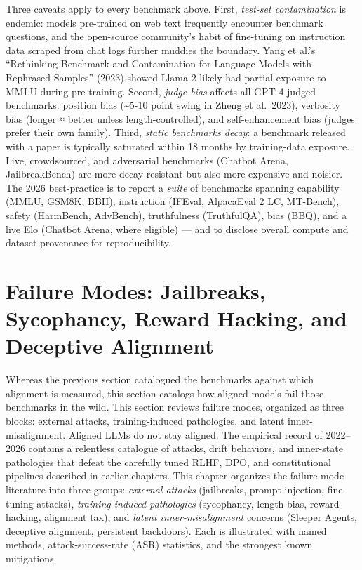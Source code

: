 Three caveats apply to every benchmark above. First, \emph{test-set contamination} is endemic: models pre-trained on web text frequently encounter benchmark questions, and the open-source community's habit of fine-tuning on instruction data scraped from chat logs further muddies the boundary. Yang et al.'s ``Rethinking Benchmark and Contamination for Language Models with Rephrased Samples'' (2023) showed Llama-2 likely had partial exposure to MMLU during pre-training. Second, \emph{judge bias} affects all GPT-4-judged benchmarks: position bias (\textasciitilde5-10 point swing in Zheng et al.~2023), verbosity bias (longer ≈ better unless length-controlled), and self-enhancement bias (judges prefer their own family). Third, \emph{static benchmarks decay}: a benchmark released with a paper is typically saturated within 18 months by training-data exposure. Live, crowdsourced, and adversarial benchmarks (Chatbot Arena, JailbreakBench) are more decay-resistant but also more expensive and noisier. The 2026 best-practice is to report a \emph{suite} of benchmarks spanning capability (MMLU, GSM8K, BBH), instruction (IFEval, AlpacaEval 2 LC, MT-Bench), safety (HarmBench, AdvBench), truthfulness (TruthfulQA), bias (BBQ), and a live Elo (Chatbot Arena, where eligible) --- and to disclose overall compute and dataset provenance for reproducibility.

\section{Failure Modes: Jailbreaks, Sycophancy, Reward Hacking, and Deceptive Alignment}\label{failure-modes-jailbreaks-sycophancy-reward-hacking-and-deceptive-alignment}

Whereas the previous section catalogued the benchmarks against which alignment is measured, this section catalogs how aligned models fail those benchmarks in the wild. This section reviews failure modes, organized as three blocks: external attacks, training-induced pathologies, and latent inner-misalignment. Aligned LLMs do not stay aligned. The empirical record of 2022--2026 contains a relentless catalogue of attacks, drift behaviors, and inner-state pathologies that defeat the carefully tuned RLHF, DPO, and constitutional pipelines described in earlier chapters. This chapter organizes the failure-mode literature into three groups: \emph{external attacks} (jailbreaks, prompt injection, fine-tuning attacks), \emph{training-induced pathologies} (sycophancy, length bias, reward hacking, alignment tax), and \emph{latent inner-misalignment} concerns (Sleeper Agents, deceptive alignment, persistent backdoors). Each is illustrated with named methods, attack-success-rate (ASR) statistics, and the strongest known mitigations.

